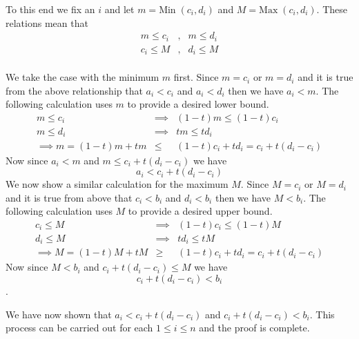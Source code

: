 \documentclass[11pt,reqno]{article}
\begin{document}
\noindent To this end we fix an $i$ and let $m = \text{Min}\; (c_i,d_i)$ and $M = \text{Max}\; (c_i,d_i)$. These relations mean that 
\begin{eqnarray*} 
m \le c_i &,& m \le d_i \\
c_i \le M &,& d_i \le M \\
\end{eqnarray*}

We take the case with the minimum $m$ first. Since $m = c_i$ or $m = d_i$ and it is true from the above relationship that $ a_i < c_i$ and $a_i < d_i$ then we have $a_i < m$.  The following calculation uses $m$ to provide a desired lower bound.
\begin{eqnarray*} 
m \le c_i &\implies& (1-t) m \le  (1-t) c_i \\
m \le d_i &\implies& t m \le  t d_i \\
\implies m = (1-t) m + t m &\le& (1 - t) c_i + t d_i = c_i + t (d_i - c_i)
\end{eqnarray*}
Now since $a_i < m$ and $m \le  c_i + t (d_i - c_i)$ we have \[ a_i < c_i + t (d_i - c_i) \]
\indent We now show a similar calculation for the maximum $M$. Since $M = c_i$ or $M = d_i$ and it is true from above that $ c_i < b_i$ and $d_i < b_i$ then we have $M < b_i$.  The following calculation uses $M$ to provide a desired upper bound.
\begin{eqnarray*} 
c_i \le M &\implies& (1-t) c_i \le  (1-t) M \\
d_i \le M &\implies& t d_i \le  t M \\
\implies M = (1-t) M + t M &\ge& (1 - t) c_i + t d_i = c_i + t (d_i - c_i)
\end{eqnarray*}
Now since $M < b_i$ and $c_i + t (d_i - c_i) \le M$ we have \[ c_i + t (d_i - c_i) < b_i \].

\noindent We have now shown that $a_i < c_i + t (d_i - c_i)$ and $c_i + t (d_i - c_i) < b_i$. This process can be carried out for each $1 \le i \le n$ and the proof is complete.
\end{document}
